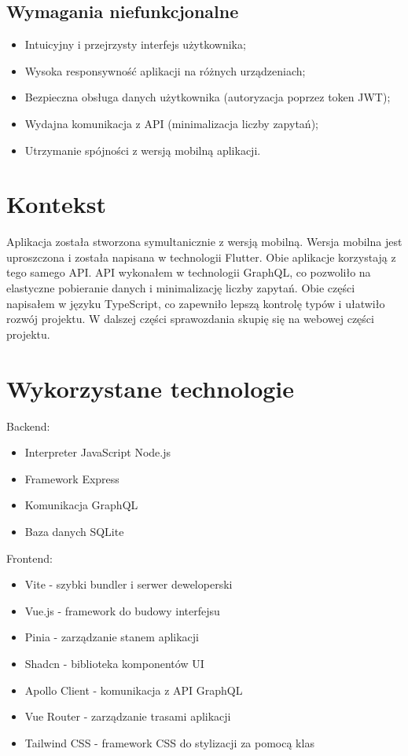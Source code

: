 \documentclass{article}
\begin{document}
	\subsection*{Wymagania niefunkcjonalne}
	\begin{itemize}
		\item Intuicyjny i przejrzysty interfejs użytkownika;
		\item Wysoka responsywność aplikacji na różnych urządzeniach;
		\item Bezpieczna obsługa danych użytkownika (autoryzacja poprzez token JWT);
		\item Wydajna komunikacja z API (minimalizacja liczby zapytań);
		\item Utrzymanie spójności z wersją mobilną aplikacji.
	\end{itemize}

    \section{Kontekst}
        Aplikacja została stworzona symultanicznie z wersją mobilną. 
        Wersja mobilna jest uproszczona i została napisana w technologii Flutter.
        Obie aplikacje korzystają z tego samego API. 
        API wykonałem w technologii GraphQL, co pozwoliło na elastyczne pobieranie danych i minimalizację liczby zapytań.
        Obie części napisałem w języku TypeScript, co zapewniło lepszą kontrolę typów i ułatwiło rozwój projektu.
        W dalszej części sprawozdania skupię się na webowej części projektu.

    \section{Wykorzystane technologie}
        Backend:
        \begin{itemize}
            \item Interpreter JavaScript Node.js
            \item Framework Express
            \item Komunikacja GraphQL
            \item Baza danych SQLite
        \end{itemize}
        Frontend:
        \begin{itemize}
            \item Vite - szybki bundler i serwer deweloperski
            \item Vue.js - framework do budowy interfejsu
            \item Pinia - zarządzanie stanem aplikacji
            \item Shadcn - biblioteka komponentów UI
            \item Apollo Client - komunikacja z API GraphQL
            \item Vue Router - zarządzanie trasami aplikacji
            \item Tailwind CSS - framework CSS do stylizacji za pomocą klas
        \end{itemize}
\end{document}
